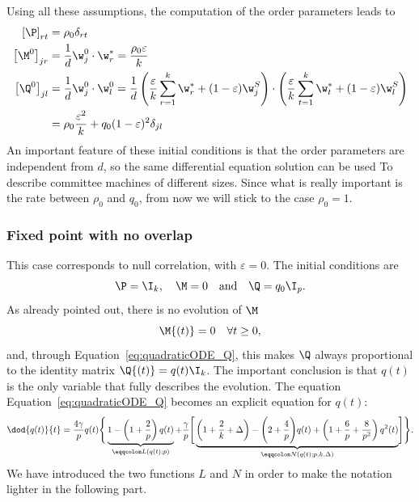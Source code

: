 Using all these assumptions, the computation of the order parameters leads to
\begin{align*}
  \left[\P\right]_{rt} &= \rho_0\delta_{rt}\\
  \left[\M^0\right]_{jr} &= \frac1d \w_j^0 \cdot \w^*_r = \frac{\rho_0\varepsilon}{k} \\
  \left[\Q^0\right]_{jl} &= \frac1d \w_j^0 \cdot \w^0_l = \frac1d
    \left(\frac{\varepsilon}{k} \sum_{r=1}^k \w^*_r + (1-\varepsilon) \w_j^S\right)\cdot
    \left(\frac{\varepsilon}{k} \sum_{t=1}^k \w^*_t + (1-\varepsilon) \w_l^S\right)\\
      &= \rho_0\frac{\varepsilon^2}{k} + q_0(1-\varepsilon)^2 \delta_{jl}
\end{align*}
An important feature of these initial conditions is that the order parameters are 
independent from \(d\), so the same differential equation solution can be used To
describe committee machines of different sizes.
Since what is really important is the rate between \(\rho_0\) and \(q_0\),
from now we will stick to the case \(\rho_0 = 1\).

\subsubsection{Fixed point with no overlap}
This case corresponds to null correlation, with \(\varepsilon=0\).
The initial conditions are 
\[\P = \I_k, \quad \M = 0 \quad \text{and}\quad \Q = q_0 \I_p.\]
As already pointed out, there is no evolution of \(\M\)
\[\M{(t)} = 0\quad \forall t\ge0,\]
and, through Equation~\eqref{eq:quadraticODE_Q},
this makes \(\Q\) always proportional to the identity matrix \(\Q{(t)} = q{(t)} \I_k\).
The important conclusion is that \(q(t)\) is the only variable that fully describes the evolution.
The equation Equation~\eqref{eq:quadraticODE_Q} becomes an explicit equation for \(q{(t)}\):
\begin{equation}\label{eq:eps0ODEforq}\begin{split}
    \dod{q{(t)}}{t} = \frac{4\gamma}{p}q{(t)}\Biggr\{\underbrace{
        1 - \left(1+\frac2p\right) q{(t)}}_{\eqqcolon L{(q{(t)};p)}}
    +\frac{\gamma}{p} \Biggr[\underbrace{
        \left(1+\frac2k+\Delta\right) - \Biggl(2 + \frac4p \Biggl)q{(t)} +
        \left(1+\frac6p+\frac{8}{p^2}\right)q^2{(t)}}_{\eqqcolon N{(q{(t)};p,k,\Delta)}}
    \Biggr]\Biggr\}.
\end{split}\end{equation}
We have introduced the two functions \(L\) and \(N\) in order to make the notation
lighter in the following part.


